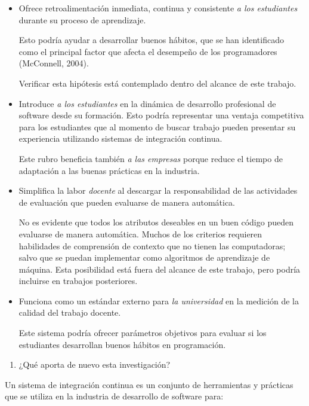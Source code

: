 \documentclass[
  12,
]{scrartcl}
\providecommand{\tightlist}{%
  \setlength{\itemsep}{0pt}\setlength{\parskip}{0pt}}
\begin{document}
\begin{itemize}
\item
  Ofrece retroalimentación inmediata, continua y consistente \emph{a los
  estudiantes} durante su proceso de aprendizaje.

  Esto podría ayudar a desarrollar buenos hábitos, que se han
  identificado como el principal factor que afecta el desempeño de los
  programadores (McConnell, 2004).

  Verificar esta hipótesis está contemplado dentro del alcance de este
  trabajo.
\item
  Introduce \emph{a los estudiantes} en la dinámica de desarrollo
  profesional de software desde su formación. Esto podría representar
  una ventaja competitiva para los estudiantes que al momento de buscar
  trabajo pueden presentar su experiencia utilizando sistemas de
  integración continua.

  Este rubro beneficia también \emph{a las empresas} porque reduce el
  tiempo de adaptación a las buenas prácticas en la industria.
\item
  Simplifica la labor \emph{docente} al descargar la responsabilidad de
  las actividades de evaluación que pueden evaluarse de manera
  automática.

  No es evidente que todos los atributos deseables en un buen código
  pueden evaluarse de manera automática. Muchos de los criterios
  requieren habilidades de comprensión de contexto que no tienen las
  computadoras; salvo que se puedan implementar como algoritmos de
  aprendizaje de máquina. Esta posibilidad está fuera del alcance de
  este trabajo, pero podría incluirse en trabajos posteriores.
\item
  Funciona como un estándar externo para \emph{la universidad} en la
  medición de la calidad del trabajo docente.

  Este sistema podría ofrecer parámetros objetivos para evaluar si los
  estudiantes desarrollan buenos hábitos en programación.
\end{itemize}

\begin{enumerate}
\def\labelenumi{\arabic{enumi}.}
\setcounter{enumi}{2}
\tightlist
\item
  ¿Qué aporta de nuevo esta investigación?
\end{enumerate}

Un sistema de integración continua es un conjunto de herramientas y
prácticas que se utiliza en la industria de desarrollo de software para:
\end{document}
